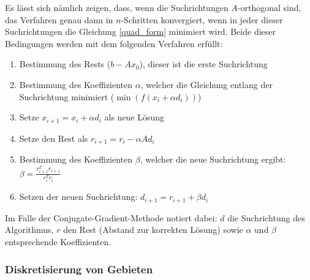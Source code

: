 Es lässt sich nämlich zeigen, dass, wenn die Suchrichtungen $A$-orthogonal sind, das Verfahren genau dann in $n$-Schritten konvergiert, wenn in jeder dieser Suchrichtungen die Gleichung \eqref{quad_form} minimiert wird. Beide dieser Bedingungen werden mit dem folgenden Verfahren erfüllt: 
\begin{enumerate}
    \item Bestimmung des Rests ($b-Ax_0$), dieser ist die erste Suchrichtung \\
    \item Bestimmung des Koeffizienten $\alpha$, welcher die Gleichung entlang der Suchrichtung minimiert ($\min(f(x_i + \alpha d_i))$) \\
    \item Setze $x_{i+1} = x_i + \alpha d_i$ als neue Lösung \\
    \item Setze den Rest als $r_{i+1} = r_i - \alpha Ad_i$ \\
    \item Bestimmung des Koeffizienten $\beta$, welcher die neue Suchrichtung ergibt: $\beta = \frac{r_{i+1}^T r_{i+1}}{r_i^T r_i}$ \\
    \item Setzen der neuen Suchrichtung: $d_{i+1} = r_{i+1} + \beta d_i$ \\
\end{enumerate}
Im Falle der Conjugate-Gradient-Methode notiert dabei: $d$ die Suchrichtung des Algorithmus, $r$ den Rest (Abstand zur korrekten Lösung) sowie $\alpha$ und $\beta$ entsprechende Koeffizienten.


\subsubsection{Diskretisierung von Gebieten}

